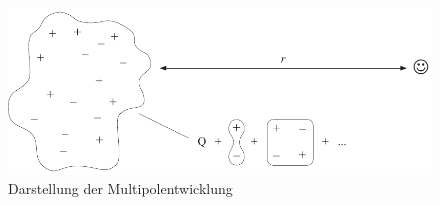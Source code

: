 \begin{figure}
    \centering
    \includegraphics[width=\linewidth]{papers/planet/pictures/Multipol.pdf}
    \caption{Darstellung der Multipolentwicklung
        \label{planet:fig:multipol}}
\end{figure}
